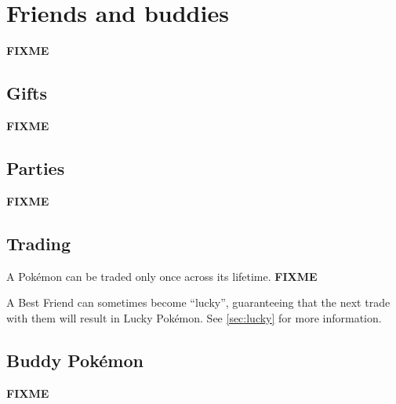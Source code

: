 \chapter{Friends and buddies}
\label{chap:friends}
\textbf{FIXME}

\section{Gifts}
\label{sec:gifts}
\textbf{FIXME}

\section{Parties}
\label{sec:parties}
\textbf{FIXME}

\section{Trading}
\label{sec:trades}
A Pokémon can be traded only once across its lifetime.
\textbf{FIXME}

A Best Friend can sometimes become ``lucky'', guaranteeing that the next trade with
  them will result in Lucky Pokémon.
See \autoref{sec:lucky} for more information.

\section{Buddy Pokémon}
\label{sec:buddies}
\textbf{FIXME}

